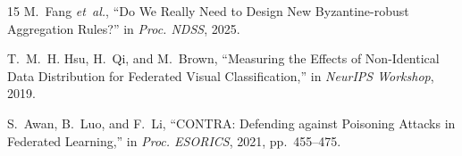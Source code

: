 \documentclass[10pt, conference]{IEEEtran}
\begin{document}
\begin{thebibliography}{15}
M.~Fang \textit{et~al.},
``Do We Really Need to Design New Byzantine-robust Aggregation Rules?''
in \textit{Proc. NDSS}, 2025.

T.~M.~H. Hsu, H.~Qi, and M.~Brown,
``Measuring the Effects of Non-Identical Data Distribution for Federated Visual Classification,''
in \textit{NeurIPS Workshop}, 2019.

S.~Awan, B.~Luo, and F.~Li,
``CONTRA: Defending against Poisoning Attacks in Federated Learning,''
in \textit{Proc. ESORICS}, 2021, pp.~455--475.


\end{thebibliography}
\end{document}
